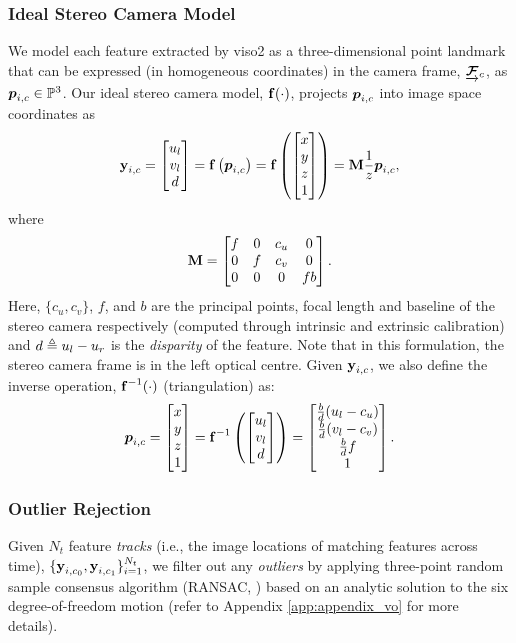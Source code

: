 \subsubsection{Ideal Stereo Camera Model}
We model each feature extracted by \textsf{viso2} as a three-dimensional point landmark that can be expressed (in homogeneous coordinates) in the camera frame, $\underrightarrow{ \boldsymbol{\mathbf{\mathcal{F}}} }_{c}$, as
$\HomogeneousPoint{i}{c} \in
\HomogeneousNumbers[3]$.  Our ideal stereo camera model, $\boldsymbol{\mathbf{f}}(\cdot)$,
projects $\boldsymbol{p}_{i,c}$ into image space coordinates as
 \begin{equation}
	\boldsymbol{\mathbf{y}}_{i, c} = \begin{bmatrix} u_l \\ v_l \\ d  \end{bmatrix}  
  =\boldsymbol{\mathbf{f}}\left(\boldsymbol{p}_{i,c}\right) =  \boldsymbol{\mathbf{f}}\left(\begin{bmatrix} x \\ y \\ z \\ 1 \end{bmatrix}\right) = 
   \boldsymbol{\mathbf{M}} \frac{1}{z} \boldsymbol{p}_{i,c},
\end{equation}
where
\begin{equation}
\boldsymbol{\mathbf{M}} = \begin{bmatrix} f & 0 & c_u & 0 \\ 0 & f & c_v & 0 \\ 0 & 0 & 0 & fb \end{bmatrix}.
\end{equation}
Here, $\{c_u, c_v\}$, $f$, and $b$ are the principal points, focal
length and baseline of the stereo camera respectively (computed through intrinsic and extrinsic calibration) and $d \triangleq u_l - u_r$ is the \textit{disparity} of the feature. Note that in this
formulation, the stereo camera frame is in the left optical centre. Given $\boldsymbol{\mathbf{y}}_{i, c}$, we also define the inverse operation, $\boldsymbol{\mathbf{f}}^{-1}(\cdot)$ (triangulation) as:
 \begin{equation}
	\boldsymbol{p}_{i,c} = \begin{bmatrix} x \\ y \\ z \\ 1 \end{bmatrix} =  \boldsymbol{\mathbf{f}}^{-1}\left( \begin{bmatrix} u_l \\ v_l \\ d \end{bmatrix} \right) =  \begin{bmatrix}  \frac{b}{d}(u_l - c_u) \\ \frac{b}{d}(v_l - c_v) \\ \frac{b}{d} f \\ 1 \end{bmatrix}.
\end{equation}



\subsubsection{Outlier Rejection}
Given $N_t$ feature \textit{tracks} (i.e., the image locations of matching features across time), $\{\boldsymbol{\mathbf{y}}_{i, c_0}, \boldsymbol{\mathbf{y}}_{i, c_1}\}_{i=1}^{N_t}$, we filter out any \textit{outliers} by applying three-point random sample consensus algorithm (RANSAC, \cite{fischler1981random}) based on an analytic solution to the six degree-of-freedom motion \citep{Umeyama1991-ws} (refer to Appendix \ref{app:appendix_vo} for more details).
  
